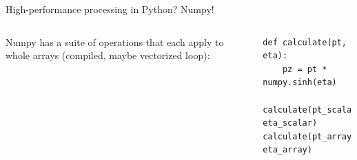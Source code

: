 \documentclass[aspectratio=169]{beamer}
\begin{document}
\begin{frame}[fragile]{High-performance processing in Python? Numpy!}
\Large
\vspace{0.5 cm}
\begin{columns}
Numpy has a suite of operations that each apply to whole arrays (compiled, maybe vectorized loop):

\small
\begin{verbatim}
def calculate(pt, eta):
    pz = pt * numpy.sinh(eta)

calculate(pt_scalar, eta_scalar)
calculate(pt_array,  eta_array)
\end{verbatim}

\Large
\vspace{0.5 cm}


\end{columns}
\end{frame}
\end{document}
